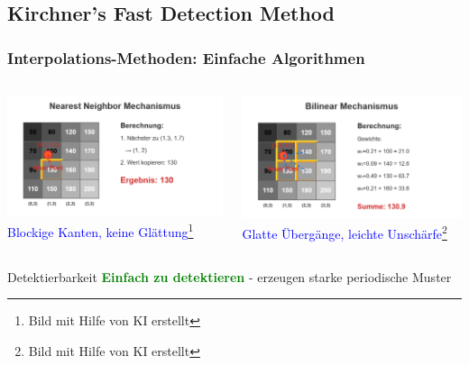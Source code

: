 \documentclass[11pt,t,usepdftitle=false,aspectratio=169]{beamer}
\begin{document}
\subsection{Kirchner's Fast Detection Method}

\begin{frame}
	\frametitle{Interpolations-Methoden: Einfache Algorithmen}
	
	\begin{columns}[T]
		\begin{column}{0.48\textwidth}
			\includegraphics[width=\textwidth]{images/nearest_mechanism.png}
			\textcolor{blue}{\small Blockige Kanten, keine Glättung}\footnote{\tiny Bild mit Hilfe von KI erstellt}
		\end{column}
		\begin{column}{0.48\textwidth}
			\includegraphics[width=\textwidth]{images/bilinear_mechanism.png}
			\textcolor{blue}{\small Glatte Übergänge, leichte Unschärfe}\footnote{\tiny Bild mit Hilfe von KI erstellt}
		\end{column}
	\end{columns}
	
	\begin{alertblock}{Detektierbarkeit}
		\textcolor{green}{\textbf{Einfach zu detektieren}} - erzeugen starke periodische Muster
	\end{alertblock}
\end{frame}
\end{document}
